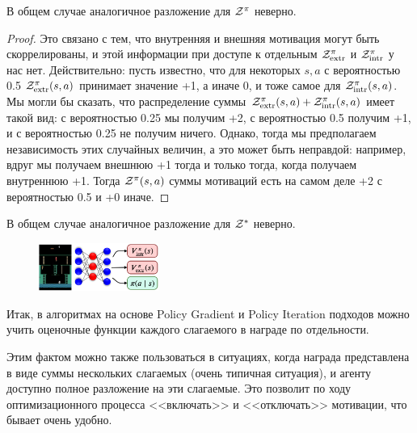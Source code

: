 \begin{proposition}
В общем случае аналогичное разложение для $\mathcal{Z}^\pi$ неверно.
\begin{proof}
Это связано с тем, что внутренняя и внешняя мотивация могут быть скоррелированы, и этой информации при доступе к отдельным $\mathcal{Z}^\pi_{\mathrm{extr}}$ и $\mathcal{Z}^\pi_{\mathrm{intr}}$ у нас нет. Действительно: пусть известно, что для некоторых $s, a$ с вероятностью 0.5 $\mathcal{Z}^\pi_{\mathrm{extr}}(s, a)$ принимает значение +1, а иначе 0, и тоже самое для $\mathcal{Z}^\pi_{\mathrm{intr}}(s, a)$. Мы могли бы сказать, что распределение суммы $\mathcal{Z}^\pi_{\mathrm{extr}}(s, a) + \mathcal{Z}^\pi_{\mathrm{intr}}(s, a)$ имеет такой вид: с вероятностью 0.25 мы получим +2, с вероятностью 0.5 получим +1, и с вероятностью 0.25 не получим ничего. Однако, тогда мы предполагаем независимость этих случайных величин, а это может быть неправдой: например, вдруг мы получаем внешнюю +1 тогда и только тогда, когда получаем внутреннюю +1. Тогда $\mathcal{Z}^\pi(s, a)$ суммы мотиваций есть на самом деле +2 с вероятностью 0.5 и +0 иначе.
\end{proof}
\end{proposition}

\begin{proposition}
В общем случае аналогичное разложение для $\mathcal{Z}^*$ неверно.
\end{proposition}

\begin{figure}
\centering
\includegraphics[width=0.35\textwidth]{Images/sepheads.png}
\end{figure}

Итак, в алгоритмах на основе Policy Gradient и Policy Iteration подходов можно учить оценочные функции каждого слагаемого в награде по отдельности.

\begin{remark}
Этим фактом можно также пользоваться в ситуациях, когда награда представлена в виде суммы нескольких слагаемых (очень типичная ситуация), и агенту доступно полное разложение на эти слагаемые. Это позволит по ходу оптимизационного процесса <<включать>> и <<отключать>> мотивации, что бывает очень удобно.
\end{remark}

